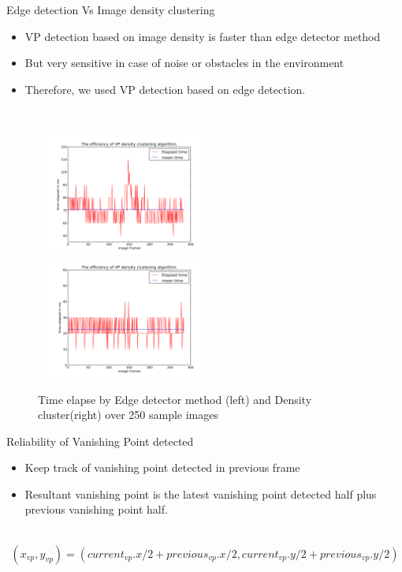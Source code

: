 \documentclass[8pt]{beamer}
\begin{document}
{{\begin{frame}{Edge detection Vs Image density clustering}
\begin{itemize}
\setlength\itemsep{1em}
 \item VP detection based on image density is faster than edge detector method 
 \item \alert{But very sensitive in case of noise or obstacles in the environment}
 \item Therefore, we used VP detection based on edge detection.
\end{itemize}\\[5pt]
\begin{figure}
\includegraphics[width=6cm, height=4cm]{images/Elapsedtimeedgedetection.png}%
\includegraphics[width=6cm, height=4cm]{images/Elapsedtimedensity.png}%
\caption{Time elapse by Edge detector method (left) and Density cluster(right) over 250 sample images}%
\end{figure}
\end{frame}
\begin{frame}{Reliability of Vanishing Point detected}
\begin{itemize}
\setlength\itemsep{1em}
 \item Keep track of vanishing point detected in previous frame
 \item Resultant vanishing point is the latest vanishing point detected half plus previous vanishing point half. 
\end{itemize}\\[5pt]
\begin{equation*}
 (x_{vp},y_{vp}) = (current_{vp}.x/2 + previous_{vp}.x/2, current_{vp}.y/2 + previous_{vp}.y/2)
\end{equation*}\\[5pt]
{ }


\end{frame}}}
\end{document}
